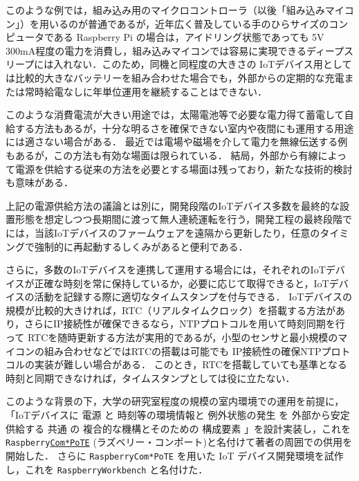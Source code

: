 このような例では，組み込み用のマイクロコントローラ（以後「組み込みマイコン」）を用いるのが普通であるが，近年広く普及している手のひらサイズのコンピュータである Raspberry Pi\cite{data:RaspberryPi} の場合は，アイドリング状態であっても 5V 300mA程度の電力を消費し，組み込みマイコンでは容易に実現できるディープスリープには入れない．このため，同機と同程度の大きさの IoTデバイス用としては比較的大きなバッテリーを組み合わせた場合でも，外部からの定期的な充電または常時給電なしに年単位運用を継続することはできない．

このような消費電流が大きい用途では，太陽電池等で必要な電力得て蓄電して自給する方法もあるが，十分な明るさを確保できない室内や夜間にも運用する用途には適さない場合がある．
最近では電場や磁場を介して電力を無線伝送する例もあるが，この方法も有効な場面は限られている．
結局，外部から有線によって電源を供給する従来の方法を必要とする場面は残っており，新たな技術的検討も意味がある．

上記の電源供給方法の議論とは別に，開発段階のIoTデバイス多数を最終的な設置形態を想定しつつ長期間に渡って無人連続運転を行う，開発工程の最終段階でには，当該IoTデバイスのファームウェアを遠隔から更新したり，任意のタイミングで強制的に再起動するしくみがあると便利である．

さらに，多数のIoTデバイスを連携して運用する場合には，それぞれのIoTデバイスが正確な時刻を常に保持しているか，必要に応じて取得できると，IoTデバイスの活動を記録する際に適切なタイムスタンプを付与できる．
IoTデバイスの規模が比較的大きければ，RTC（リアルタイムクロック）を搭載する方法があり，さらにIP接続性が確保できるなら，NTPプロトコルを用いて時刻同期を行って
RTCを随時更新する方法が実用的であるが，小型のセンサと最小規模のマイコンの組み合わせなどではRTCの搭載は可能でも IP接続性の確保NTPプロトコルの実装が難しい場合がある．
このとき，RTCを搭載していても基準となる時刻と同期できなければ，タイムスタンプとしては役に立たない．

このような背景の下，大学の研究室程度の規模の室内環境での運用を前提に，
「IoTデバイスに
電源 と
時刻等の環境情報と
例外状態の発生 を
外部から安定供給する
共通 の
複合的な機構とそのための
構成要素
」を設計実装し，これを
{\tt Raspberry\underline{Com*PoTE}}
(ラズベリー・コンポート)と名付けて著者の周囲での供用を開始した．
さらに {\tt Raspberry\-Com*PoTE} を用いた IoT デバイス開発環境を試作し，これを
{\tt RaspberryWorkbench}
と名付けた．

